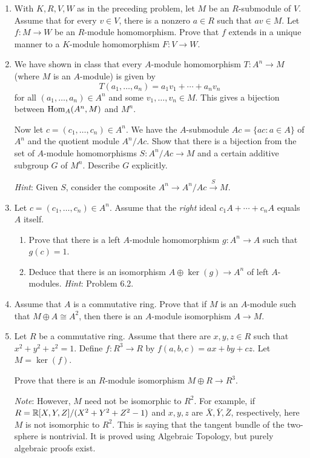 \documentclass[../psets.tex]{subfiles}
\begin{document}
\begin{enumerate}
    \item With $K,R,V,W$ as in the preceding problem, let $M$ be an $R$-submodule of $V$. Assume that for every $v\in V$, there is a nonzero $a\in R$ such that $av\in M$. Let $f:M\to W$ be an $R$-module homomorphism. Prove that $f$ extends in a unique manner to a $K$-module homomorphism $F:V\to W$.
    \item We have shown in class that every $A$-module homomorphism $T:A^n\to M$ (where $M$ is an $A$-module) is given by
    \begin{equation*}
        T(a_1,\dots,a_n) = a_1v_1+\cdots+a_nv_n
    \end{equation*}
    for all $(a_1,\dots,a_n)\in A^n$ and some $v_1,\dots,v_n\in M$. This gives a bijection between $\operatorname{Hom}_A(A^n,M)$ and $M^n$.\par
    Now let $c=(c_1,\dots,c_n)\in A^n$. We have the $A$-submodule $Ac=\{ac:a\in A\}$ of $A^n$ and the quotient module $A^n/Ac$. Show that there is a bijection from the set of $A$-module homomorphisms $S:A^n/Ac\to M$ and a certain additive subgroup $G$ of $M^n$. Describe $G$ explicitly.\par
    \emph{Hint}: Given $S$, consider the composite $A^n\to A^n/Ac\xrightarrow{S}M$.
    \item Let $c=(c_1,\dots,c_n)\in A^n$. Assume that the \emph{right} ideal $c_1A+\cdots+c_nA$ equals $A$ itself.
    \begin{enumerate}
        \item Prove that there is a left $A$-module homomorphism $g:A^n\to A$ such that $g(c)=1$.
        \item Deduce that there is an isomorphism $A\oplus\ker(g)\to A^n$ of left $A$-modules. \emph{Hint}: Problem 6.2.
    \end{enumerate}
    \item Assume that $A$ is a commutative ring. Prove that if $M$ is an $A$-module such that $M\oplus A\cong A^2$, then there is an $A$-module isomorphism $A\to M$.
    \item Let $R$ be a commutative ring. Assume that there are $x,y,z\in R$ such that $x^2+y^2+z^2=1$. Define $f:R^3\to R$ by $f(a,b,c)=ax+by+cz$. Let $M=\ker(f)$.\par
    Prove that there is an $R$-module isomorphism $M\oplus R\to R^3$.\par
    \emph{Note}: However, $M$ need not be isomorphic to $R^2$. For example, if $R=\mathbb{R}[X,Y,Z]/(X^2+Y^2+Z^2-1)$ and $x,y,z$ are $\bar{X},\bar{Y},\bar{Z}$, respectively, here $M$ is not isomorphic to $R^2$. This is saying that the tangent bundle of the two-sphere is nontrivial. It is proved using Algebraic Topology, but purely algebraic proofs exist.

\end{enumerate}
\end{document}
